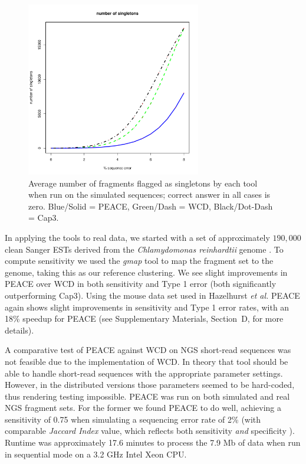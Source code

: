 \documentclass[a4,center,fleqn]{NAR}
\newcommand{\peace} {{\small PEACE}}
\newcommand{\wcd} {{\small WCD}}
\newcommand{\capthree} {{\small Cap3}}
\begin{document}
\begin{figure}
  \centerline{\includegraphics[width=3in]{pics.d/singletons.pdf}}
  \caption{Average number of fragments flagged as singletons by each tool
    when run on the simulated sequences; correct answer in all cases is
    zero.  Blue/Solid = \peace, Green/Dash = \wcd,
    Black/Dot-Dash = \capthree.}\label{singletons}
\end{figure}

In applying the tools to real data, we started with a set of
approximately $190,000$ clean Sanger ESTs derived from the {\it
  Chlamydomonas reinhardtii} genome \cite{Liang2008}.  To compute
sensitivity we used the {\it gmap} tool \cite{Wu05} to map the
fragment set to the genome, taking this as our reference clustering.
We see slight improvements in \peace\/ over \wcd\/ in both sensitivity
and Type 1 error (both significantly outperforming \capthree).  Using
the mouse data set used in Hazelhurst {\it et al.}
\cite{Hazelhurst08a} \peace\/ again shows slight improvements in
sensitivity and Type 1 error rates, with an 18\% speedup for \peace\/ 
(see Supplementary Materials, Section~D, for more details).

A comparative test of \peace\/ against \wcd\/ on NGS short-read sequences
was not feasible due to the implementation of \wcd.  In theory that
tool should be able to handle short-read sequences with the
appropriate parameter settings.  However, in the distributed versions those
parameters seemed to be hard-coded, thus rendering testing impossible.
\peace\/ was run on both simulated and real NGS fragment sets.  For the
former we found \peace\/ to do well, achieving a sensitivity of 0.75
when simulating a sequencing error rate of 2\% (with comparable {\it
  Jaccard Index} value, which reflects both sensitivity {\it and}
specificity \cite{Kalyanaraman03,Hazelhurst08a}).  Runtime was
approximately 17.6 minutes to process the 7.9 Mb of data when run in
sequential mode on a 3.2 GHz Intel Xeon CPU.
\end{document}
